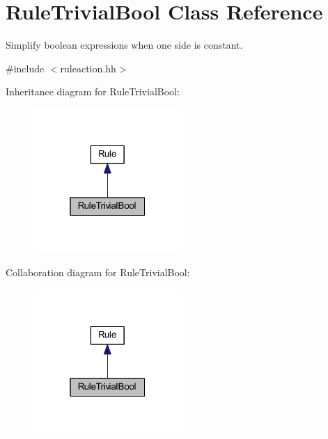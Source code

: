 \hypertarget{class_rule_trivial_bool}{}\section{Rule\+Trivial\+Bool Class Reference}
\label{class_rule_trivial_bool}


Simplify boolean expressions when one side is constant.  




{\ttfamily \#include $<$ruleaction.\+hh$>$}



Inheritance diagram for Rule\+Trivial\+Bool\+:
\nopagebreak
\begin{figure}[H]
\begin{center}
\leavevmode
\includegraphics[width=160pt]{class_rule_trivial_bool__inherit__graph}
\end{center}
\end{figure}


Collaboration diagram for Rule\+Trivial\+Bool\+:
\nopagebreak
\begin{figure}[H]
\begin{center}
\leavevmode
\includegraphics[width=160pt]{class_rule_trivial_bool__coll__graph}
\end{center}
\end{figure}
